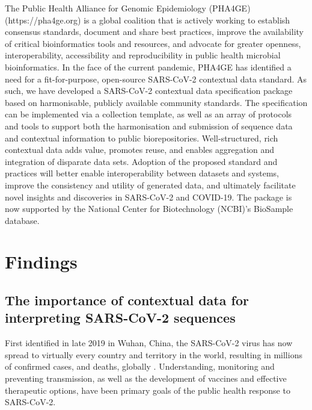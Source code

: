 The Public Health Alliance for Genomic Epidemiology (PHA4GE) (https://pha4ge.org) is a global coalition that is actively working to establish consensus standards, document and share best practices, improve the availability of critical bioinformatics tools and resources, and advocate for greater openness, interoperability, accessibility and reproducibility in public health microbial bioinformatics. In the face of the current pandemic, PHA4GE has identified a need for a fit-for-purpose, open-source SARS-CoV-2 contextual data standard. As such, we have developed a SARS-CoV-2 contextual data specification package based on harmonisable, publicly available community standards. The specification can be implemented via a collection template, as well as an array of protocols and tools to support both the harmonisation and submission of sequence data and contextual information to public biorepositories. Well-structured, rich contextual data adds value, promotes reuse, and enables aggregation and integration of disparate data sets. Adoption of the proposed standard and practices will better enable interoperability between datasets and systems, improve the consistency and utility of generated data, and ultimately facilitate novel insights and discoveries in SARS-CoV-2 and COVID-19. The package is now supported by the National Center for Biotechnology (NCBI)'s BioSample database.

\section{Findings} \label{sec:ch7_findings}

\subsection{The importance of contextual data for interpreting SARS-CoV-2 sequences}

First identified in late 2019 in Wuhan, China, the SARS-CoV-2 virus has now spread to virtually every country and territory in the world, resulting in millions of confirmed cases, and deaths, globally \cite{world_health_organization_coronavirus_nodate, dong_interactive_2020}. Understanding, monitoring and preventing transmission, as well as the development of vaccines and effective therapeutic options, have been primary goals of the public health response to SARS-CoV-2. 


